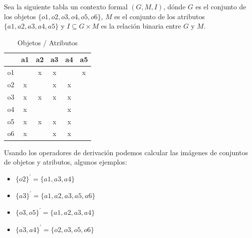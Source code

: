 \documentclass[../../main.tex]{subfiles}
\begin{document}
Sea la siguiente tabla un contexto formal $(G, M, I)$, dónde $G$ es el conjunto de los objetos $\{ o1, o2, o3, o4, o5, o6 \}$, 
$M$ es el conjunto de los atributos $\{ a1, a2, a3, a4, a5 \}$ y $I \subseteq G \times M$ es la relación binaria entre $G$ y $M$.

\begin{table}[H]
    \begin{center}
    \begin{tabular}{|c|c|c|c|c|c|}
    \hline
    \multicolumn{1}{|l|}{} & \multicolumn{1}{l|}{a1} & \multicolumn{1}{l|}{a2} & \multicolumn{1}{l|}{a3} & \multicolumn{1}{l|}{a4} & \multicolumn{1}{l|}{a5} \\ \hline
    o1                     &                         & x                       & x                       &                         & x                       \\ \hline
    o2                     & x                       &                         & x                       & x                       &                         \\ \hline
    o3                     & x                       & x                       & x                       & x                       &                         \\ \hline
    o4                     & x                       &                         &                         & x                       &                         \\ \hline
    o5                     & x                       & x                       & x                       & x                       &                         \\ \hline
    o6                     & x                       &                         & x                       & x                       &                         \\ \hline
    \end{tabular}
    \end{center}
    \caption{Objetos / Atributos}
\end{table}

Usando los operadores de derivación podemos calcular las imágenes de conjuntos de objetos y atributos, algunos ejemplos:

\begin{itemize}
    \item $\{ o2 \}^{'} = \{ a1, a3, a4 \}$ 
    \item $\{ a3 \}^{'} = \{ a1, a2, a3, a5, a6 \}$ 
    \item $\{ o3, o5 \}^{'} = \{ a1, a2, a3, a4 \}$ 
    \item $\{ a3, a4 \}^{'} = \{ o2, o3, o5, o6 \}$ 
\end{itemize}
\end{document}
